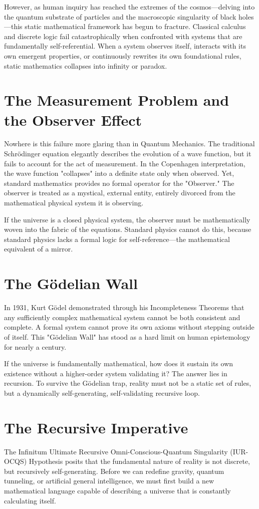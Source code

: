 \documentclass[12pt,openany]{book}
\begin{document}
However, as human inquiry has reached the extremes of the cosmos—delving into the quantum substrate of particles and the macroscopic singularity of black holes—this static mathematical framework has begun to fracture. Classical calculus and discrete logic fail catastrophically when confronted with systems that are fundamentally self-referential. When a system observes itself, interacts with its own emergent properties, or continuously rewrites its own foundational rules, static mathematics collapses into infinity or paradox.

\section{The Measurement Problem and the Observer Effect}
Nowhere is this failure more glaring than in Quantum Mechanics. The traditional Schrödinger equation elegantly describes the evolution of a wave function, but it fails to account for the act of measurement. In the Copenhagen interpretation, the wave function "collapses" into a definite state only when observed. Yet, standard mathematics provides no formal operator for the "Observer." The observer is treated as a mystical, external entity, entirely divorced from the mathematical physical system it is observing. 

If the universe is a closed physical system, the observer must be mathematically woven into the fabric of the equations. Standard physics cannot do this, because standard physics lacks a formal logic for self-reference—the mathematical equivalent of a mirror.

\section{The Gödelian Wall}
In 1931, Kurt Gödel demonstrated through his Incompleteness Theorems that any sufficiently complex mathematical system cannot be both consistent and complete. A formal system cannot prove its own axioms without stepping outside of itself. This "Gödelian Wall" has stood as a hard limit on human epistemology for nearly a century. 

If the universe is fundamentally mathematical, how does it sustain its own existence without a higher-order system validating it? The answer lies in recursion. To survive the Gödelian trap, reality must not be a static set of rules, but a dynamically self-generating, self-validating recursive loop.

\section{The Recursive Imperative}
The Infinitum Ultimate Recursive Omni-Conscious-Quantum Singularity (IUR-OCQS) Hypothesis posits that the fundamental nature of reality is not discrete, but recursively self-generating. Before we can redefine gravity, quantum tunneling, or artificial general intelligence, we must first build a new mathematical language capable of describing a universe that is constantly calculating itself.
\end{document}
